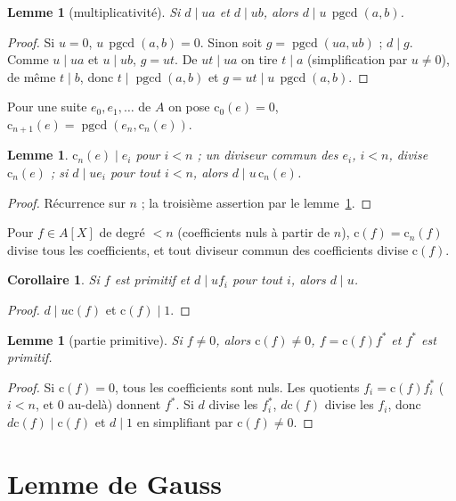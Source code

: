 \documentclass[11pt]{amsart}
\newtheorem{lemma}[theorem]{Lemme}
\newtheorem{corollary}[theorem]{Corollaire}
\theoremstyle{definition}
\theoremstyle{remark}
\newcommand{\pgcd}{\operatorname{pgcd}}
\newcommand{\cont}{\mathrm c}
\begin{document}
\begin{lemma}[multiplicativité]\label{lem:M}
Si $d\mid ua$ et $d\mid ub$, alors $d\mid u\,\pgcd(a,b)$.
\end{lemma}
\begin{proof}
Si $u=0$, $u\,\pgcd(a,b)=0$. Sinon soit $g=\pgcd(ua,ub)$ ; $d\mid g$.
Comme $u\mid ua$ et $u\mid ub$, $g=ut$. De $ut\mid ua$ on tire $t\mid a$
(simplification par $u\ne0$), de même $t\mid b$, donc
$t\mid\pgcd(a,b)$ et $g=ut\mid u\,\pgcd(a,b)$.
\end{proof}

Pour une suite $e_0,e_1,\dots$ de $A$ on pose $\cont_0(e)=0$,
$\cont_{n+1}(e)=\pgcd(e_n,\cont_n(e))$.

\begin{lemma}\label{lem:cont}
$\cont_n(e)\mid e_i$ pour $i<n$ ; un diviseur commun des $e_i$, $i<n$,
divise $\cont_n(e)$ ; si $d\mid ue_i$ pour tout $i<n$, alors
$d\mid u\,\cont_n(e)$.
\end{lemma}
\begin{proof}
Récurrence sur $n$ ; la troisième assertion par le lemme~\ref{lem:M}.
\end{proof}

Pour $f\in A[X]$ de degré $<n$ (coefficients nuls à partir de $n$),
$\cont(f)=\cont_n(f)$ divise tous les coefficients, et tout diviseur
commun des coefficients divise $\cont(f)$.

\begin{corollary}\label{cor:P}
Si $f$ est primitif et $d\mid uf_i$ pour tout $i$, alors $d\mid u$.
\end{corollary}
\begin{proof}
$d\mid u\cont(f)$ et $\cont(f)\mid1$.
\end{proof}

\begin{lemma}[partie primitive]\label{lem:pp}
Si $f\ne0$, alors $\cont(f)\ne0$, $f=\cont(f)f^*$ et $f^*$ est primitif.
\end{lemma}
\begin{proof}
Si $\cont(f)=0$, tous les coefficients sont nuls. Les quotients
$f_i=\cont(f)f^*_i$ ($i<n$, et $0$ au-delà) donnent $f^*$. Si $d$ divise
les $f^*_i$, $d\cont(f)$ divise les $f_i$, donc $d\cont(f)\mid\cont(f)$
et $d\mid1$ en simplifiant par $\cont(f)\ne0$.
\end{proof}

\section{Lemme de Gauss}
\end{document}
